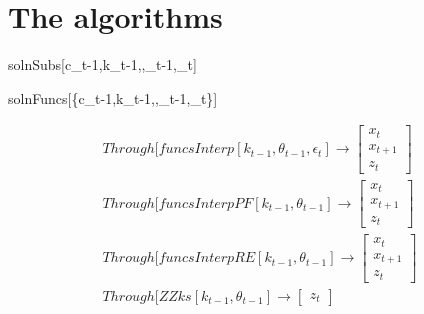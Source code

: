 \documentclass[12pt]{article}
\begin{document}
\appendix
\newpage

     
\section{The algorithms}
\label{sec:algorithms}

\begin{pseudocode}{solnSubs}{[c_{t-1},k_{t-1},,\theta_{t-1},\epsilon_t]}
\end{pseudocode}


\begin{pseudocode}{solnFuncs}{[\{c_{t-1},k_{t-1},,\theta_{t-1},\epsilon_t\}]}
\end{pseudocode}

 \begin{gather}
 Through[funcsInterp[k_{t-1},\theta_{t-1},\epsilon_t] \rightarrow
 \begin{bmatrix}
   x_t\\x_{t+1}\\z_t
 \end{bmatrix}
 \\
 Through[funcsInterpPF[k_{t-1},\theta_{t-1}]\rightarrow
 \begin{bmatrix}
   x_t\\x_{t+1}\\z_t
 \end{bmatrix}
\\
 Through[funcsInterpRE[k_{t-1},\theta_{t-1}]\rightarrow
 \begin{bmatrix}
   x_t\\x_{t+1}\\z_t
 \end{bmatrix}
\\
 Through[ZZks[k_{t-1},\theta_{t-1}]\rightarrow
 \begin{bmatrix}
z_t
 \end{bmatrix}
\\
 \end{gather}



\end{document}
